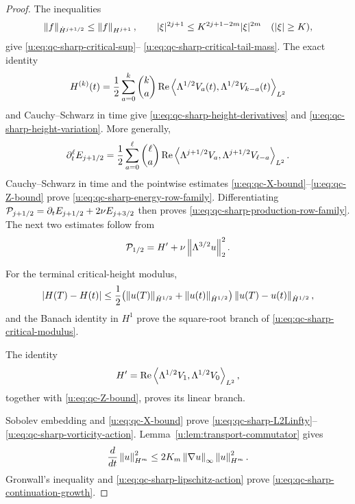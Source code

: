 {\begin{proof}
The inequalities
\[
 \left\lVert f\right\rVert_{\dot H^{j+1/2}}\le\left\lVert f\right\rVert_{H^{j+1}},
 \qquad
 |\xi|^{2j+1}\le K^{2j+1-2m}|\xi|^{2m}
 \quad(|\xi|\ge K),
\]
give \eqref{u:eq:qc-sharp-critical-sup}--%
\eqref{u:eq:qc-sharp-critical-tail-mass}.  The exact identity
\[
 H^{(k)}(t)=\frac12\sum_{a=0}^{k}\binom ka
 \operatorname{Re}\left\langle \Lambda^{1/2}V_a(t),\Lambda^{1/2}V_{k-a}(t)\right\rangle_{L^2}
\]
and Cauchy--Schwarz in time give
\eqref{u:eq:qc-sharp-height-derivatives} and
\eqref{u:eq:qc-sharp-height-variation}.  More generally,
\[
 \partial_t^\ell E_{j+1/2}
 =\frac12\sum_{a=0}^{\ell}\binom\ell a
 \operatorname{Re}\left\langle \Lambda^{j+1/2}V_a,\Lambda^{j+1/2}V_{\ell-a}\right\rangle_{L^2}.
\]
Cauchy--Schwarz in time and the pointwise estimates
\eqref{u:eq:qc-X-bound}--\eqref{u:eq:qc-Z-bound} prove
\eqref{u:eq:qc-sharp-energy-row-family}.  Differentiating
\(\mathcal P_{j+1/2}=\partial_tE_{j+1/2}+2\nu E_{j+3/2}\)
then proves \eqref{u:eq:qc-sharp-production-row-family}.  The next two
estimates follow from
\[
 \mathcal P_{1/2}=H'+\nu\left\lVert \Lambda^{3/2}u\right\rVert_2^2.
\]
\begin{samepage}
For the terminal critical-height modulus,
\[
 |H(T)-H(t)|
 \le\frac12\bigl(
 \left\lVert u(T)\right\rVert_{\dot H^{1/2}}+\left\lVert u(t)\right\rVert_{\dot H^{1/2}}
 \bigr)\left\lVert u(T)-u(t)\right\rVert_{\dot H^{1/2}},
\]
and the Banach identity in \(H^1\) prove the square-root branch of
\eqref{u:eq:qc-sharp-critical-modulus}.
\par
\end{samepage}
The identity
\[
 H'=\operatorname{Re}
 \left\langle \Lambda^{1/2}V_1,\Lambda^{1/2}V_0\right\rangle_{L^2},
\]
together with \eqref{u:eq:qc-Z-bound}, proves its linear branch.

Sobolev embedding and \eqref{u:eq:qc-X-bound} prove
\eqref{u:eq:qc-sharp-L2Linfty}--\eqref{u:eq:qc-sharp-vorticity-action}.
Lemma~\ref{u:lem:transport-commutator} gives
\[
 \frac d{dt}\left\lVert u\right\rVert_{H^m}^2
 \le2K_m\left\lVert \nabla u\right\rVert_\infty\left\lVert u\right\rVert_{H^m}^2.
\]
Gronwall's inequality and \eqref{u:eq:qc-sharp-lipschitz-action} prove
\eqref{u:eq:qc-sharp-continuation-growth}.
\end{proof}
}

